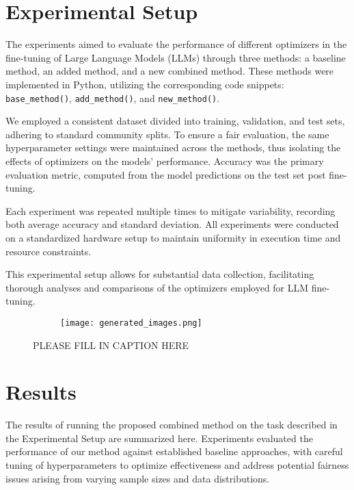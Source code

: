 \documentclass{article} %
\begin{document}
\section{Experimental Setup}
\label{sec:experimental}
The experiments aimed to evaluate the performance of different optimizers in the fine-tuning of Large Language Models (LLMs) through three methods: a baseline method, an added method, and a new combined method. These methods were implemented in Python, utilizing the corresponding code snippets: \texttt{base\_method()}, \texttt{add\_method()}, and \texttt{new\_method()}.

We employed a consistent dataset divided into training, validation, and test sets, adhering to standard community splits. To ensure a fair evaluation, the same hyperparameter settings were maintained across the methods, thus isolating the effects of optimizers on the models' performance. Accuracy was the primary evaluation metric, computed from the model predictions on the test set post fine-tuning.

Each experiment was repeated multiple times to mitigate variability, recording both average accuracy and standard deviation. All experiments were conducted on a standardized hardware setup to maintain uniformity in execution time and resource constraints.

This experimental setup allows for substantial data collection, facilitating thorough analyses and comparisons of the optimizers employed for LLM fine-tuning.

\begin{figure}[t]
    \centering
    \begin{subfigure}{0.9\textwidth}
        \texttt{[image: generated\_images.png]}
        \label{fig:diffusion-samples}
    \end{subfigure}
    \caption{PLEASE FILL IN CAPTION HERE}
    \label{fig:first_figure}
\end{figure}

\section{Results}
\label{sec:results}
The results of running the proposed combined method on the task described in the Experimental Setup are summarized here. Experiments evaluated the performance of our method against established baseline approaches, with careful tuning of hyperparameters to optimize effectiveness and address potential fairness issues arising from varying sample sizes and data distributions.
\end{document}
